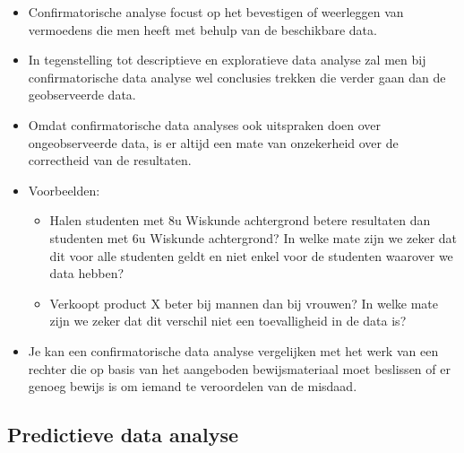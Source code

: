 \documentclass[]{memoir}
\providecommand{\tightlist}{%
  \setlength{\itemsep}{0pt}\setlength{\parskip}{0pt}}
\begin{document}
\begin{itemize}
\tightlist
\item
  Confirmatorische analyse focust op het bevestigen of weerleggen van
  vermoedens die men heeft met behulp van de beschikbare data.
\item
  In tegenstelling tot descriptieve en exploratieve data analyse zal men
  bij confirmatorische data analyse wel conclusies trekken die verder
  gaan dan de geobserveerde data.
\item
  Omdat confirmatorische data analyses ook uitspraken doen over
  ongeobserveerde data, is er altijd een mate van onzekerheid over de
  correctheid van de resultaten.
\item
  Voorbeelden:

  \begin{itemize}
  \tightlist
  \item
    Halen studenten met 8u Wiskunde achtergrond betere resultaten dan
    studenten met 6u Wiskunde achtergrond? In welke mate zijn we zeker
    dat dit voor alle studenten geldt en niet enkel voor de studenten
    waarover we data hebben?
  \item
    Verkoopt product X beter bij mannen dan bij vrouwen? In welke mate
    zijn we zeker dat dit verschil niet een toevalligheid in de data is?
  \end{itemize}
\item
  Je kan een confirmatorische data analyse vergelijken met het werk van
  een rechter die op basis van het aangeboden bewijsmateriaal moet
  beslissen of er genoeg bewijs is om iemand te veroordelen van de
  misdaad.
\end{itemize}

\subsection*{Predictieve data analyse}\label{predictieve-data-analyse}
\end{document}
